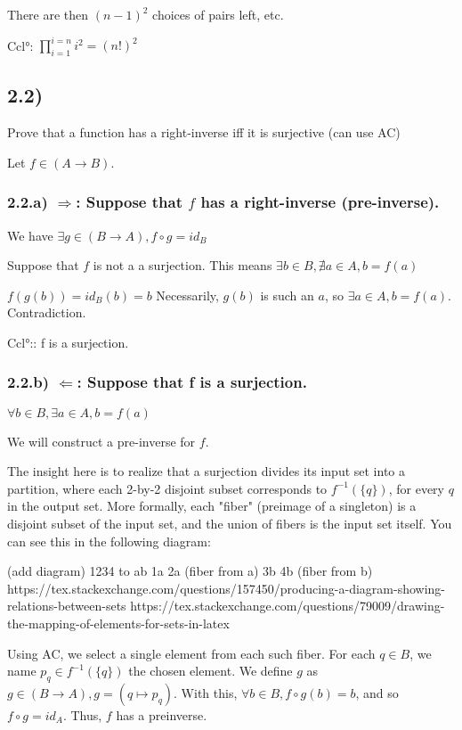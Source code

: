\documentclass[12pt, letterpaper, twoside]{report}
\begin{document}
There are then $(n-1)^2$ choices of pairs left, etc.

Ccl°: $\prod_{i=1}^{i=n} i^2 = (n!)^2$



\subsection*{2.2)}

Prove that a function has a right-inverse iff it is surjective (can use AC)

Let $f \in (A \to B)$.

\subsubsection*{2.2.a) $\Rightarrow$: Suppose that $f$ has a right-inverse (pre-inverse).}
We have $\exists g \in (B \to A), f \circ g = id_B$

Suppose that $f$ is not a a surjection. This means $\exists b \in B, \nexists a \in A, b = f(a)$

$f(g(b))= id_B (b) = b$ Necessarily, $g(b)$ is such an $a$, so $\exists a \in A, b = f(a)$. Contradiction.

Ccl°:: f is a surjection.

\subsubsection*{2.2.b) $\Leftarrow$: Suppose that f is a surjection.}

$\forall b \in B, \exists a \in A, b = f(a)$

We will construct a pre-inverse for $f$.

The insight here is to realize that a surjection divides its input set into a partition, where each 2-by-2 disjoint subset corresponds to $f^{-1}(\{q\})$, for every $q$ in the output set. More formally, each "fiber" (preimage of a singleton) is a disjoint subset of the input set, and the union of fibers is the input set itself. You can see this in the following diagram:

(add diagram)
1234 to ab
1a 2a (fiber from a)
3b 4b (fiber from b)
https://tex.stackexchange.com/questions/157450/producing-a-diagram-showing-relations-between-sets
https://tex.stackexchange.com/questions/79009/drawing-the-mapping-of-elements-for-sets-in-latex

Using AC, we select a single element from each such fiber. For each $q \in B$, we name $p_q \in f^{-1}(\{q\})$ the chosen element. We define $g$ as $g \in (B \to A), g = (q \mapsto p_q)$. With this, $\forall b \in B, f \circ g (b) = b$, and so $f \circ g = id_A$. Thus, $f$ has a preinverse.
\end{document}

